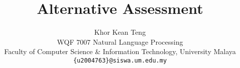 \documentclass{article}
\title{Alternative Assessment}
\author{
  Khor Kean Teng \\
  WQF 7007 Natural Language Processing \\
  Faculty of Computer Science \& Information Technology, University Malaya \\
  \texttt{\{u2004763\}@siswa.um.edu.my} \\
}
\begin{document}
\maketitle






\sloppy
\printbibliography
\end{document}
